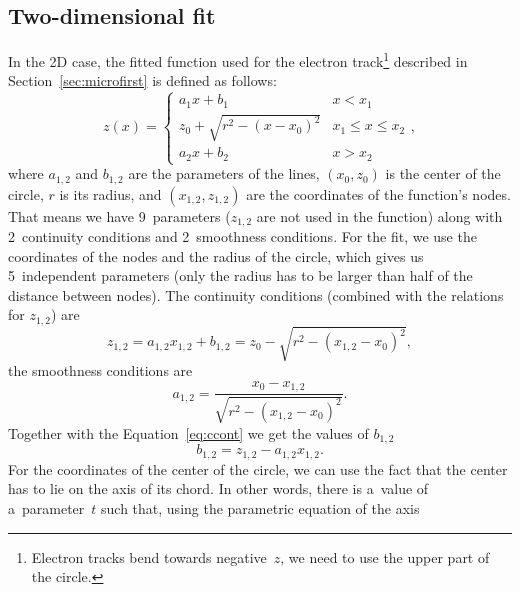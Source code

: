 		\subsection{Two-dimensional fit}
			In the 2D case, the fitted function used for the electron track\footnote{Electron tracks bend towards negative~$z$, we need to use the upper part of the circle.} described in Section~\ref{sec:microfirst} is defined as follows:
				\begin{equation}
					\label{eq:clines2d}
					z(x) = \begin{cases}
								a_1x+b_1 & x<x_1\\
								z_0+\sqrt{r^2-(x-x_0)^2} & x_1\leq x\leq x_2\\
								a_2x+b_2 & x>x_2
						   \end{cases},
				\end{equation}
			where $a_{1,2}$ and $b_{1,2}$ are the parameters of the lines, $(x_0,z_0)$ is the center of the circle, $r$ is its radius, and $(x_{1,2},z_{1,2})$ are the coordinates of the function's nodes. That means we have 9~parameters ($z_{1,2}$ are not used in the function) along with 2~continuity conditions and 2~smoothness conditions. For the fit, we use the coordinates of the nodes and the radius of the circle, which gives us 5~independent parameters (only the radius has to be larger than half of the distance between nodes). The continuity conditions (combined with the relations for $z_{1,2}$) are
				\begin{equation}
					\label{eq:ccont}
					z_{1,2} = a_{1,2}x_{1,2}+b_{1,2} = z_0-\sqrt{r^2-(x_{1,2}-x_0)^2},
				\end{equation}
			the smoothness conditions are
				\begin{equation}
					\label{eq:a12}
					a_{1,2} = \frac{x_0-x_{1,2}}{\sqrt{r^2-(x_{1,2}-x_0)^2}}.
				\end{equation}
			Together with the Equation~\ref{eq:ccont} we get the values of $b_{1,2}$
				\begin{equation}
					\label{eq:b12}
					b_{1,2} = z_{1,2} - a_{1,2} x_{1,2}.
				\end{equation}
			For the coordinates of the center of the circle, we can use the fact that the center has to lie on the axis of its chord. In other words, there is a~value of a~parameter~$t$ such that, using the parametric equation of the axis
